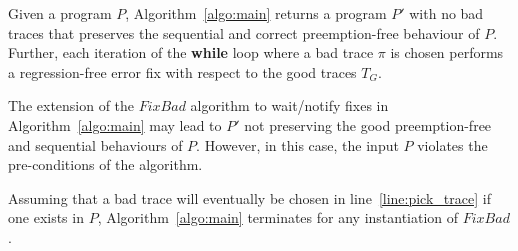 \documentclass{llncs}
\newcommand\new{\color{red}}
\newcommand\remove[1]{}
\newcommand\Prog{\ensuremath{\mathit{P}}}
\newcommand\trace{\pi}
\newcommand\FixBad{\mathit{FixBad}}
\begin{document}
\begin{theorem}[Soundness]
  \label{lem:algo_soundness}
  Given a program $\Prog$, Algorithm~\ref{algo:main} returns a program
  $\Prog'$ with no bad traces that preserves the sequential and correct
  preemption-free behaviour of $\Prog$.
  Further, each iteration of the {\bf while} loop where a bad trace
  $\trace$ is chosen performs a regression-free error fix with respect
  to the good traces $T_G$.
\end{theorem}
\remove{
\begin{proof}[outline]
  We need to show there are no bad traces in $\Prog'$ and all sequential traces remain.
  The first follows because the algorithm only terminates if $\Prog'$ is correct and
  the second follows because we do not insert wait-notify statements. Additionally we need to show that 
  if all preemption-free traces are good they are preserved. This is guaranteed by $\FixBad$
  as it does not do transformations across preemption-points if the trace is not preemption-free.
  
  We further need to show that no regression is introduced in each iteration and that the
  bad trace disappears. These follow directly from the properties of $\FixBad$.
\end{proof}
}
The extension of the $\FixBad$ algorithm to wait/notify
fixes in Algorithm~\ref{algo:main} may lead to $\Prog'$ not preserving
the good preemption-free and sequential behaviours of $\Prog$.
However, in this case, the input $\Prog$ violates the pre-conditions 
of the algorithm.


\begin{theorem}
  Assuming that a bad trace will eventually be chosen in 
  line~\ref{line:pick_trace} if one exists in $\Prog$, Algorithm~\ref{algo:main}
  terminates for any instantiation of $\FixBad$.
\end{theorem}
\remove{
\begin{proof}[outline]
 {\new Fairness guarantees that eventually a bad trace will be chosen if there exists one.
 Every call to $\FixBad$ either increases an atomic section or adds a constraint. The number of both is finite. The correct program always exists because every thread can be wrapped into an atomic section and all sequential traces are good.
}\end{proof}
}
\end{document}
